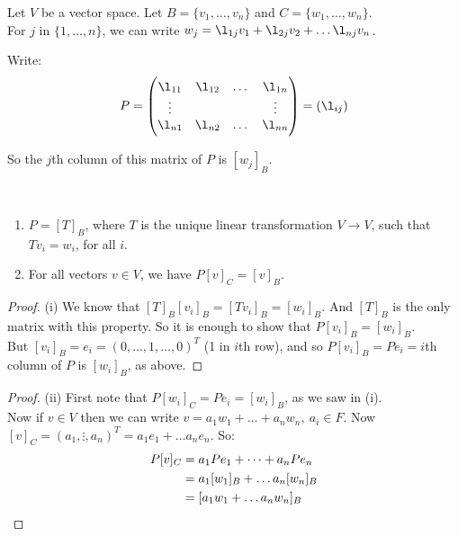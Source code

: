  

 Let    
 $V$ be a vector space. Let $B = \{v_1,\dots,v_n\}$ and $C = \{w_1,\dots,w_n\}$. \\
 For $j$ in $\{1, \dots,n\}$, we can write $w_j = \l_{1j}v_1 + \l_{2j}v_2 + \dots \l_{nj}v_n $.
 
 Write:\[
 P =
 \begin{pmatrix}
 \l_{11} & \l_{12} & \dots & \l_{1n}\\
 \vdots & &  & \vdots \\
 \l_{n1} & \l_{n2} & \dots & \l_{nn}
 \end{pmatrix} = (\l_{ij})
 \]
 
 So the $j$th column of this matrix of $P$ is $[w_j]_B$.\\
 
\begin{proposition}~ \begin{enumerate}
 \item[(i)] $P = [T]_B$, where $T$ is the unique linear transformation $V \to V$, such that $Tv_i = w_i$, for all $i$.
 \item[(ii)] For all vectors $v \in V$, we have $P[v]_C = [v]_B$. 
 
 \end{enumerate}
 \end{proposition}

\begin{proof} (i)
We know that $[T]_B[v_i]_B = [Tv_i]_B = [w_i]_B$. And  $[T]_B$ is the only matrix with this property. So it is enough to show that $P[v_i]_B = [w_i]_B$.\\

But $[v_i]_B = e_i = (0,\dots,1,\dots,0)^T$ (1 in $i$th row), and so $P[v_i]_B =  Pe_i = i$th column of $P$ is $[w_i]_B$, as above.
\end{proof}

\begin{proof} (ii)
First note that $P[w_i]_C = Pe_i = [w_i]_B$, as we saw in (i). \\

Now if $v \in V$ then we can write $v = a_1w_1 + \dots + a_nw_n, ~a_i \in F.$ Now $[v]_C = (a_1,\vdots,a_n)^T = a_1e_1 + \dots a_ne_n$. So:
\[
 \begin{aligned}P[v]_C &= a_1Pe_1 + \dots + a_nPe_n\\
 & = a_1[w_1]_B + \dots a_n[w_n]_B \\
 &= [a_1w_1 + \dots a_nw_n]_B\qedhere
 \end{aligned}
\]
\end{proof}\vspace*{10pt}

